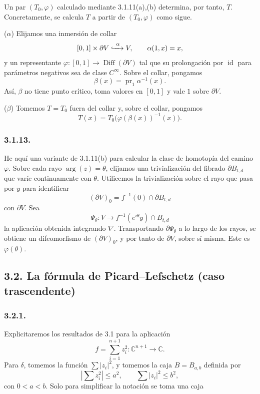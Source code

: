 Un par $(T_0,\varphi)$ calculado mediante 3.1.11(a),(b) determina, por
tanto, $T$. Concretamente, se calcula $T$ a partir de
$(T_0,\varphi)$ como sigue.

\medskip
\noindent\textup{($\alpha$)} Elijamos una inmersión de collar
\[
[0,1]\times\partial V\xhookrightarrow{\ \alpha\ }V,
\qquad \alpha(1,x)=x,
\]
y un representante
$\varphi:[0,1]\to\operatorname{Diff}(\partial V)$ tal que su
prolongación por $\operatorname{id}$ para parámetros negativos sea de
clase $C^\infty$. Sobre el collar, pongamos
\[
\beta(x)=\operatorname{pr}_1\alpha^{-1}(x).
\]
Así, $\beta$ no tiene punto crítico, toma valores en $[0,1]$ y vale
$1$ sobre $\partial V$.

\medskip
\noindent\textup{($\beta$)} Tomemos $T=T_0$ fuera del collar y, sobre
el collar, pongamos
\[
T(x)=T_0\bigl(\varphi(\beta(x))^{-1}(x)\bigr).
\]

\subsubsection*{3.1.13.}
He aquí una variante de 3.1.11(b) para calcular la clase de homotopía
del camino $\varphi$. Sobre cada rayo $\arg(z)=\theta$, elijamos una
trivialización del fibrado $\partial B_{t,d}$ que varíe continuamente
con $\theta$. Utilicemos la trivialización sobre el rayo que pasa por
$y$ para identificar
\[
(\partial V)_0=f^{-1}(0)\cap\partial B_{t,d}
\]
con $\partial V$. Sea
\[
\Psi_\theta:V\longrightarrow
f^{-1}(e^{i\theta}y)\cap B_{t,d}
\]
la aplicación obtenida integrando $\nabla$. Transportando
$\partial\Psi_\theta$ a lo largo de los rayos, se obtiene un
difeomorfismo de $(\partial V)_0$, y por tanto de $\partial V$, sobre
sí misma. Este es $\varphi(\theta)$.

\subsection*{3.2. La fórmula de Picard--Lefschetz (caso trascendente)}

\subsubsection*{3.2.1.}
Explicitaremos los resultados de 3.1 para la aplicación
\[
f=\sum_{i=1}^{n+1}z_i^2:\mathbb C^{n+1}\longrightarrow\mathbb C.
\]
Para $\delta$, tomemos la función $\sum |z_i|^2$, y tomemos la caja
$B=B_{a,b}$ definida por
\[
\left|\sum z_i^2\right|\leq a^2,
\qquad
\sum |z_i|^2\leq b^2,
\]
con $0<a<b$. Solo para simplificar la notación se toma una caja

